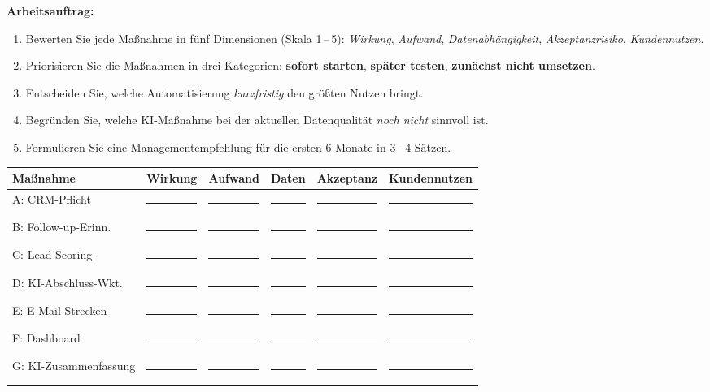 \documentclass[11pt,a4paper,oneside]{article}
\newcommand{\fachbegriff}[1]{\textbf{#1}}
\begin{document}
\noindent\textbf{Arbeitsauftrag:}

\begin{enumerate}
  \item Bewerten Sie jede Maßnahme in fünf Dimensionen (Skala 1\,--\,5): \emph{Wirkung}, \emph{Aufwand}, \emph{Datenabhängigkeit}, \emph{Akzeptanzrisiko}, \emph{Kundennutzen}.
  \item Priorisieren Sie die Maßnahmen in drei Kategorien: \fachbegriff{sofort starten}, \fachbegriff{später testen}, \fachbegriff{zunächst nicht umsetzen}.
  \item Entscheiden Sie, welche Automatisierung \emph{kurzfristig} den größten Nutzen bringt.
  \item Begründen Sie, welche KI-Maßnahme bei der aktuellen Datenqualität \emph{noch nicht} sinnvoll ist.
  \item Formulieren Sie eine Managementempfehlung für die ersten 6 Monate in 3\,--\,4 Sätzen.
\end{enumerate}

\medskip
\noindent\begin{tabularx}{\linewidth}{@{}l|c|c|c|c|c@{}}
\toprule
\textbf{Maßnahme} & \textbf{Wirkung} & \textbf{Aufwand} & \textbf{Daten} & \textbf{Akzeptanz} & \textbf{Kundennutzen} \\
\midrule
A: CRM-Pflicht        & \rule{1.2em}{0.4pt} & \rule{1.2em}{0.4pt} & \rule{1.2em}{0.4pt} & \rule{1.2em}{0.4pt} & \rule{1.2em}{0.4pt} \\
B: Follow-up-Erinn.   & \rule{1.2em}{0.4pt} & \rule{1.2em}{0.4pt} & \rule{1.2em}{0.4pt} & \rule{1.2em}{0.4pt} & \rule{1.2em}{0.4pt} \\
C: Lead Scoring       & \rule{1.2em}{0.4pt} & \rule{1.2em}{0.4pt} & \rule{1.2em}{0.4pt} & \rule{1.2em}{0.4pt} & \rule{1.2em}{0.4pt} \\
D: KI-Abschluss-Wkt.  & \rule{1.2em}{0.4pt} & \rule{1.2em}{0.4pt} & \rule{1.2em}{0.4pt} & \rule{1.2em}{0.4pt} & \rule{1.2em}{0.4pt} \\
E: E-Mail-Strecken    & \rule{1.2em}{0.4pt} & \rule{1.2em}{0.4pt} & \rule{1.2em}{0.4pt} & \rule{1.2em}{0.4pt} & \rule{1.2em}{0.4pt} \\
F: Dashboard          & \rule{1.2em}{0.4pt} & \rule{1.2em}{0.4pt} & \rule{1.2em}{0.4pt} & \rule{1.2em}{0.4pt} & \rule{1.2em}{0.4pt} \\
G: KI-Zusammenfassung & \rule{1.2em}{0.4pt} & \rule{1.2em}{0.4pt} & \rule{1.2em}{0.4pt} & \rule{1.2em}{0.4pt} & \rule{1.2em}{0.4pt} \\
\bottomrule
\end{tabularx}
\end{document}

